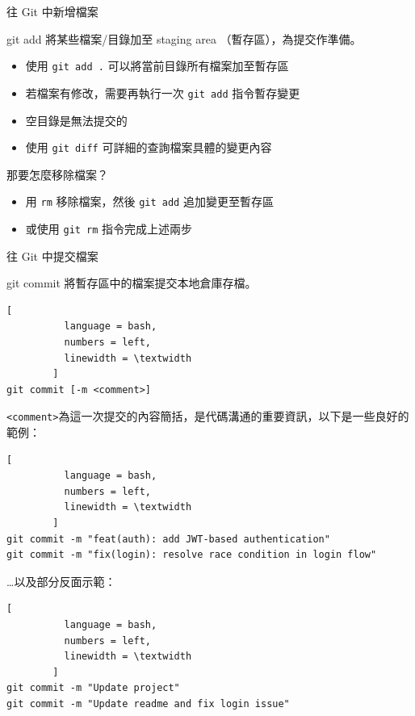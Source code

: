 \documentclass[xetex, unicode, 10pt, aspectratio=169]{beamer}
\begin{document}
\begin{frame}{往 Git 中新增檔案}
    \begin{block}{git add}
        將某些檔案/目錄加至 staging area （暫存區），為提交作準備。
        \begin{itemize}
            \item 使用 \texttt{git add .} 可以將當前目錄所有檔案加至暫存區
            \item 若檔案有修改，需要再執行一次 \texttt{git add} 指令暫存變更
            \item 空目錄是無法提交的
            \item 使用 \texttt{git diff} 可詳細的查詢檔案具體的變更內容
        \end{itemize}
    \end{block}
    \pause
    \begin{block}{那要怎麼移除檔案？}
        \begin{itemize}
            \item 用 \texttt{rm} 移除檔案，然後 \texttt{git add} 追加變更至暫存區
            \item 或使用 \texttt{git rm} 指令完成上述兩步
        \end{itemize}
    \end{block}
\end{frame}

\begin{frame}[fragile]{往 Git 中提交檔案}
    \begin{block}{git commit}
        將暫存區中的檔案提交本地倉庫存檔。
        \begin{lstlisting}[
          language = bash,
          numbers = left,
          linewidth = \textwidth
        ]
git commit [-m <comment>]\end{lstlisting}
        \texttt{<comment>}為這一次提交的內容簡括，是代碼溝通的重要資訊，以下是一些良好的範例：
        \begin{lstlisting}[
          language = bash,
          numbers = left,
          linewidth = \textwidth
        ]
git commit -m "feat(auth): add JWT-based authentication"
git commit -m "fix(login): resolve race condition in login flow"\end{lstlisting}
        \dots 以及部分反面示範：
        \begin{lstlisting}[
          language = bash,
          numbers = left,
          linewidth = \textwidth
        ]
git commit -m "Update project"
git commit -m "Update readme and fix login issue"\end{lstlisting}
    \end{block}
\end{frame}
\end{document}
